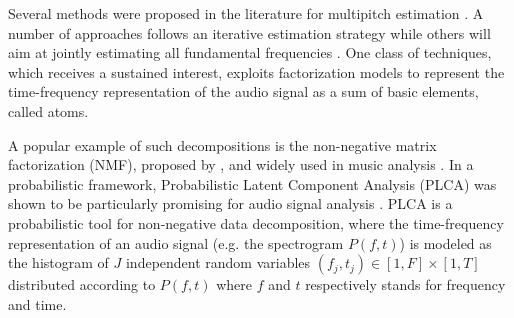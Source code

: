 \documentclass{article}
\begin{document}

\vspace{0.1cm}

Several methods were proposed in the literature for multipitch estimation \cite{Christensen2009_Morgan}. A number of approaches follows an iterative estimation strategy \cite{Klapuri2008} while others will aim at jointly estimating all fundamental frequencies \cite{Davy2006, Vincent2010_IEEE, Fuentes2012_EUSIPCO}. One class of techniques, which receives a sustained interest, exploits factorization models to represent the time-frequency representation of the audio signal as a sum of basic elements, called atoms.

\vspace{0.1cm}

A popular example of such decompositions is the non-negative matrix factorization (NMF), proposed by \cite{Lee99}, and widely used in music analysis \cite{Durrieu2011, Smaragdis03, Virtanen2008, Dessein10}.
In a probabilistic framework, Probabilistic Latent Component Analysis (PLCA) was shown to be particularly promising for audio signal analysis \cite{Benetos11c,Smaragdis06,Smaragdis08}.
PLCA is a probabilistic tool for non-negative data decomposition, where the time-frequency representation of an audio signal (e.g. the spectrogram $P(f,t)$) is modeled as the histogram of $J$ independent random variables $(f_j,t_j) \in \left[ 1,F \right] \times \left[ 1,T \right]$ distributed according to $P(f,t)$ where $f$ and $t$ respectively stands for frequency and time.
\end{document}
